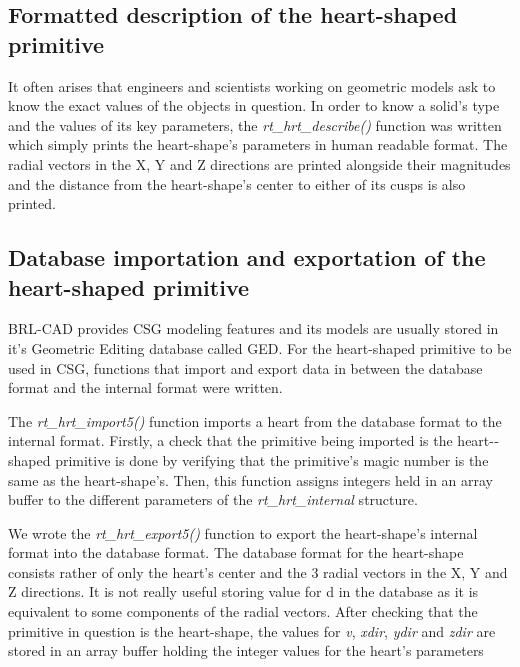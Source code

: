 \subsection{Formatted description of the heart­-shaped primitive}

\hspace{30} It   often   arises   that   engineers   and   scientists   working   on   geometric   models  
ask   to   know   the   exact   values   of   the   objects   in   question.   In   order   to   know   a  
solid's   type   and   the   values   of   its   key   parameters,  the   \textit{rt\_hrt\_describe()}  
function was written  which   simply   prints   the   heart-shape's   parameters   in   human   readable   format.  
The   radial   vectors   in   the   X,   Y   and   Z   directions   are   printed   alongside   their  
magnitudes   and   the   distance   from   the   heart-shape's   center   to   either   of   its   cusps   is  
also printed.

\subsection{Database importation and exportation of the heart­-shaped primitive}

\hspace{30} BRL-­CAD   provides   CSG   modeling   features   and   its   models   are   usually  
stored   in   it's   Geometric   Editing   database   called   GED.   For   the   heart-­shaped  
primitive   to   be   used   in   CSG, functions that import and export data in between 
the database format and the internal format were written. 
  
The   \textit{rt\_hrt\_import5()}   function   imports   a   heart   from   the   database   format   to   the  
internal   format.   Firstly,  a check   that   the   primitive   being   imported   is   the  
heart-­shaped   primitive is done  by   verifying   that   the   primitive's   magic   number   is   the  
same   as   the   heart­-shape's.   Then,   this   function   assigns   integers   held   in   an   array  
buffer to the different parameters of the \textit{rt\_hrt\_internal} structure.
   
We   wrote   the   \textit{rt\_hrt\_export5()}   function   to   export   the   heart-­shape's   internal  
format   into   the   database   format.   The   database   format   for   the   heart­-shape  
consists   rather   of   only   the   heart's   center   and   the   3   radial   vectors   in   the   X,   Y   and  
Z   directions.   It   is   not   really   useful   storing   value   for   d   in   the   database   as   it   is  
equivalent   to   some   components   of   the   radial   vectors.   After   checking   that   the  
primitive   in   question   is   the   heart-shape, the   values   for   \textit{v},   \textit{xdir},   \textit{ydir}   and   \textit{zdir} are stored in an array buffer holding the integer values for the heart's parameters

